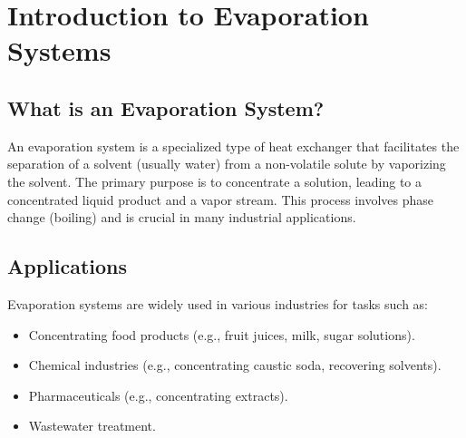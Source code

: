 
\newcommand{\BPE}{BPE} %
\newcommand{\Psol}{P_{\text{sol}}} %
\newcommand{\Ppure}{P_{\text{pure}}} %
\newcommand{\xwater}{x_{\text{H}_2\text{O}}} %
\newcommand{\gammaAct}{\gamma} %
\newcommand{\mf}{m_F} %
\newcommand{\mv}{m_V} %
\newcommand{\ml}{m_L} %
\newcommand{\xs}{x_S} %
\newcommand{\Hs}{H_S} %
\newcommand{\Hc}{H_C} %
\newcommand{\HF}{H_F} %
\newcommand{\HV}{H_V} %
\newcommand{\HL}{H_L} %
\newcommand{\Usystem}{U} %
\newcommand{\Aheat}{A} %
\newcommand{\DeltaTavail}{\Delta T_{\text{avail}}} %
\newcommand{\Economy}{E} %
\newcommand{\Capacity}{C} %

\section{Introduction to Evaporation Systems}

\subsection{What is an Evaporation System?}
An evaporation system is a specialized type of heat exchanger that facilitates the separation of a solvent (usually water) from a non-volatile solute by vaporizing the solvent. The primary purpose is to concentrate a solution, leading to a concentrated liquid product and a vapor stream. This process involves phase change (boiling) and is crucial in many industrial applications.

\subsection{Applications}
Evaporation systems are widely used in various industries for tasks such as:
\begin{itemize}
    \item Concentrating food products (e.g., fruit juices, milk, sugar solutions).
    \item Chemical industries (e.g., concentrating caustic soda, recovering solvents).
    \item Pharmaceuticals (e.g., concentrating extracts).
    \item Wastewater treatment.
\end{itemize}

